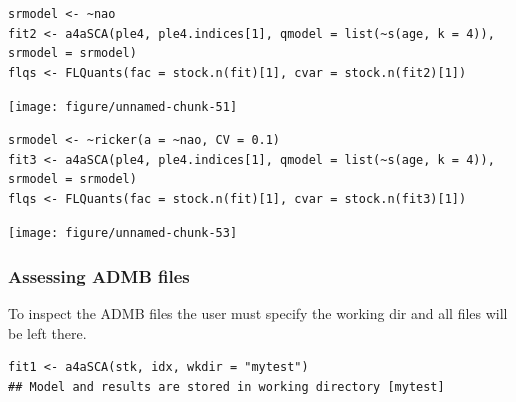 \documentclass[a4paper,english,10pt]{article}\usepackage[]{graphicx}\usepackage[]{color}
\makeatletter
\newenvironment{kframe}{%
 \def\at@end@of@kframe{}%
 \ifinner\ifhmode%
  \def\at@end@of@kframe{\end{minipage}}%
  \begin{minipage}{\columnwidth}%
 \fi\fi%
 \def\FrameCommand##1{\hskip\@totalleftmargin \hskip-\fboxsep
 \colorbox{shadecolor}{##1}\hskip-\fboxsep
     \hskip-\linewidth \hskip-\@totalleftmargin \hskip\columnwidth}%
 \MakeFramed {\advance\hsize-\width
   \@totalleftmargin\z@ \linewidth\hsize
   \@setminipage}}%
 {\par\unskip\endMakeFramed%
 \at@end@of@kframe}
\newenvironment{knitrout}{}{} %
\makeatother
\begin{document}
\begin{knitrout}
\color{fgcolor}\begin{kframe}
\begin{verbatim}
srmodel <- ~nao
fit2 <- a4aSCA(ple4, ple4.indices[1], qmodel = list(~s(age, k = 4)), srmodel = srmodel)
flqs <- FLQuants(fac = stock.n(fit)[1], cvar = stock.n(fit2)[1])
\end{verbatim}
\end{kframe}
\end{knitrout}


\begin{knitrout}
\color{fgcolor}

{\centering \texttt{[image: figure/unnamed-chunk-51]} 

}



\end{knitrout}


\begin{knitrout}
\color{fgcolor}\begin{kframe}
\begin{verbatim}
srmodel <- ~ricker(a = ~nao, CV = 0.1)
fit3 <- a4aSCA(ple4, ple4.indices[1], qmodel = list(~s(age, k = 4)), srmodel = srmodel)
flqs <- FLQuants(fac = stock.n(fit)[1], cvar = stock.n(fit3)[1])
\end{verbatim}
\end{kframe}
\end{knitrout}


\begin{knitrout}
\color{fgcolor}

{\centering \texttt{[image: figure/unnamed-chunk-53]} 

}



\end{knitrout}


\subsubsection{Assessing ADMB files}

To inspect the ADMB files the user must specify the working dir and all files will be left there.

\begin{knitrout}
\color{fgcolor}\begin{kframe}
\begin{verbatim}
fit1 <- a4aSCA(stk, idx, wkdir = "mytest")
## Model and results are stored in working directory [mytest]
\end{verbatim}
\end{kframe}
\end{knitrout}
\end{document}
